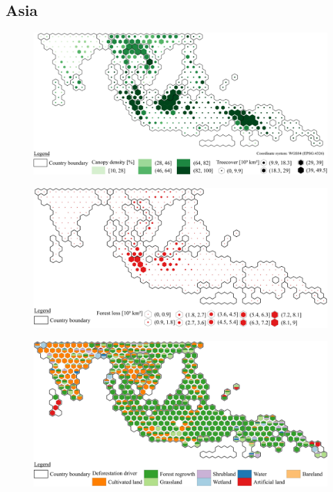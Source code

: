 		\subsection{Asia}
			\begin{figure}[ht]
				\centering
				\includegraphics[scale=1]{img/asia_treecover_frameless}
				\caption[Ecosystem service values]{}
				\label{fig:asiacover}
			\end{figure}
			\begin{figure}[ht]
				\centering
				\includegraphics[scale=1]{img/asia_loss_frameless}
				\caption[Ecosystem service values]{}
				\label{fig:asialoss}
			\end{figure}
			\begin{figure}[ht]
				\centering
				\includegraphics[scale=1]{img/asia_driver_frameless}
				\caption[Ecosystem service values]{}
				\label{fig:asiadriver}
			\end{figure}


